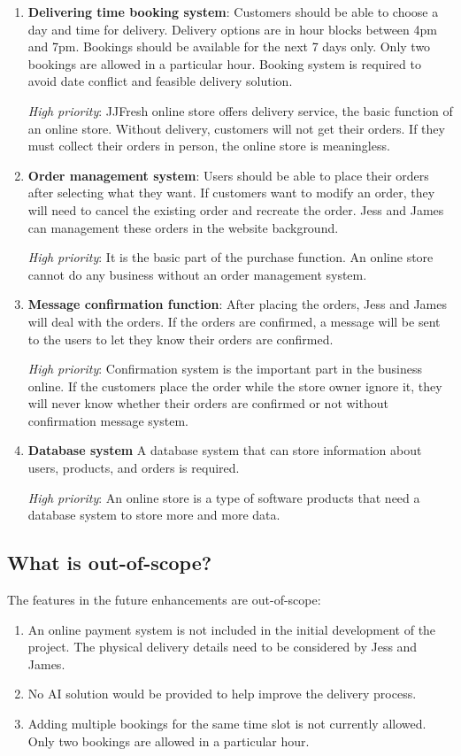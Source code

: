 \documentclass{report}
\begin{document}
\begin{enumerate}
  \item \textbf{Delivering time booking system}: Customers should be able to choose a day and time for delivery. Delivery options are in hour blocks between 4pm and 7pm. Bookings should be available for the next 7 days only. Only two bookings are allowed in a particular hour. Booking system is required to avoid date conflict and feasible delivery solution.

  \textit{High priority}: JJFresh online store offers delivery service, the basic function of an online store. Without delivery, customers will not get their orders. If they must collect their orders in person, the online store is meaningless.

  \item \textbf{Order management system}: Users should be able to place their orders after selecting what they want. If customers want to modify an order, they will need to cancel the existing order and recreate the order. Jess and James can management these orders in the website background.

  \textit{High priority}: It is the basic part of the purchase function. An online store cannot do any business without an order management system.
  
  \item \textbf{Message confirmation function}: After placing the orders, Jess and James will deal with the orders. If the orders are confirmed, a message will be sent to the users to let they know their orders are confirmed.

  \textit{High priority}: Confirmation system is the important part in the business online. If the customers place the order while the store owner ignore it, they will never know whether their orders are confirmed or not without confirmation message system.

  \item \textbf{Database system} A database system that can store information about users, products, and orders is required.

  \textit{High priority}: An online store is a type of software products that need a database system to store more and more data.
\end{enumerate}
\subsection{What is out-of-scope?}
The features in the future enhancements are out-of-scope:
\begin{enumerate}
  \item An online payment system is not included in the initial development of the project. The physical delivery details need to be considered by Jess and James.
  \item No AI solution would be provided to help improve the delivery process.
  \item Adding multiple bookings for the same time slot is not currently allowed. Only two bookings are allowed in a particular hour.
\end{enumerate}
\end{document}
